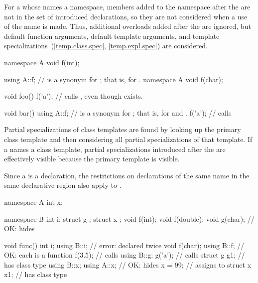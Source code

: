 \pnum
\begin{note}
For a 
whose  names a namespace,
members added to the namespace after the 
are not in the set of introduced declarations, so they are not
considered when a use of the name is made. Thus, additional
overloads added after the  are ignored, but
default function arguments, default template
arguments, and template specializations~(\ref{temp.class.spec},
\ref{temp.expl.spec}) are considered. \end{note}
\begin{example}

\begin{codeblock}
namespace A {
  void f(int);
}

using A::f;         //  is a synonym for ; that is, for .
namespace A {
  void f(char);
}

void foo() {
  f('a');           // calls , even though  exists.
}

void bar() {
  using A::f;       //  is a synonym for ; that is, for  and .
  f('a');           // calls 
}
\end{codeblock}
\end{example}

\pnum
\begin{note}
Partial specializations of class templates are found by looking up the
primary class template and then considering all partial specializations
of that template. If a  names a class
template, partial specializations introduced after the
 are effectively visible because the primary
template is visible.
\end{note}

\pnum
Since a  is a declaration, the restrictions
on declarations of the same name in the same declarative
region also apply to .
\begin{example}

\begin{codeblock}
namespace A {
  int x;
}

namespace B {
  int i;
  struct g { };
  struct x { };
  void f(int);
  void f(double);
  void g(char);     // OK: hides 
}

void func() {
  int i;
  using B::i;       // error:  declared twice
  void f(char);
  using B::f;       // OK: each  is a function
  f(3.5);           // calls 
  using B::g;
  g('a');           // calls 
  struct g g1;      //  has class type 
  using B::x;
  using A::x;       // OK: hides 
  x = 99;           // assigns to 
  struct x x1;      //  has class type 
}
\end{codeblock}
\end{example}


